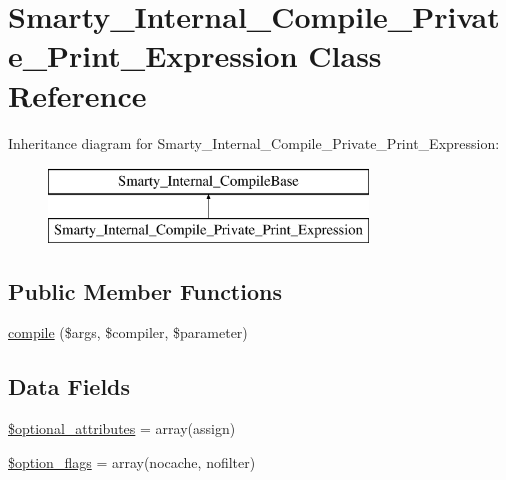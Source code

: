 \hypertarget{class_smarty___internal___compile___private___print___expression}{}\section{Smarty\+\_\+\+Internal\+\_\+\+Compile\+\_\+\+Private\+\_\+\+Print\+\_\+\+Expression Class Reference}
\label{class_smarty___internal___compile___private___print___expression}
Inheritance diagram for Smarty\+\_\+\+Internal\+\_\+\+Compile\+\_\+\+Private\+\_\+\+Print\+\_\+\+Expression\+:\begin{figure}[H]
\begin{center}
\leavevmode
\includegraphics[height=2.000000cm]{class_smarty___internal___compile___private___print___expression}
\end{center}
\end{figure}
\subsection*{Public Member Functions}
\begin{DoxyCompactItemize}
\item 
\hyperlink{class_smarty___internal___compile___private___print___expression_a84998958b9fc8c11c2ebe9620a49b853}{compile} (\$args, \$compiler, \$parameter)
\end{DoxyCompactItemize}
\subsection*{Data Fields}
\begin{DoxyCompactItemize}
\item 
\hyperlink{class_smarty___internal___compile___private___print___expression_a899d1eb4a6fecbd6ce696adb171c80a4}{\$optional\+\_\+attributes} = array(\textquotesingle{}assign\textquotesingle{})
\item 
\hyperlink{class_smarty___internal___compile___private___print___expression_a54756b34496938296f08038f7cf7c46a}{\$option\+\_\+flags} = array(\textquotesingle{}nocache\textquotesingle{}, \textquotesingle{}nofilter\textquotesingle{})
\end{DoxyCompactItemize}


